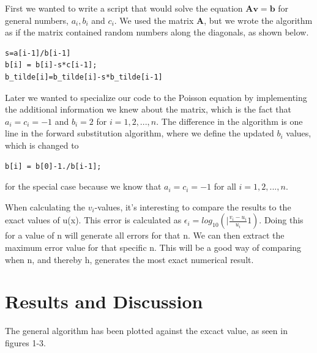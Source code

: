 \documentclass[%
oneside,                 %
final,                   %
10pt]{article}
\begin{document}
First we wanted to write a script that would solve the equation $\mathbf{Av}=\mathbf{b}$ for general numbers,
$a_i, b_i$ and $c_i$. We used the matrix $\mathbf A$, but we wrote the algorithm as if the matrix contained random numbers along the diagonals, as shown below.
\begin{lstlisting}
s=a[i-1]/b[i-1]
b[i] = b[i]-s*c[i-1];
b_tilde[i]=b_tilde[i]-s*b_tilde[i-1]
\end{lstlisting}

Later we wanted to specialize our code to the Poisson equation by implementing the additional information we knew about the matrix, which is the fact that $a_i=c_i=-1$ and $b_i=2$ for $i=1, 2, ..., n$. The difference in the algorithm is one line in the forward substitution algorithm, where we define the updated $b_i$ values, which is changed to

\begin{lstlisting}
b[i] = b[0]-1./b[i-1];
\end{lstlisting}
for the special case because we know that $a_i=c_i=-1$ for all $i=1, 2, ..., n$.

When calculating the $v_i$-values, it's interesting to compare the results to the exact values of u(x). This error is calculated as $\epsilon_{i}=log_{10}(|\frac{v_i-u_i}{u_i}1)$. Doing this for a value of n will generate all errors for that n. We can then extract the maximum error value for that specific n. This will be a good way of comparing when n, and thereby h, generates the most exact numerical result.


\newpage{}
\section{Results and Discussion}

The general algorithm has been plotted against the excact value, as seen in figures 1-3.
\end{document}
